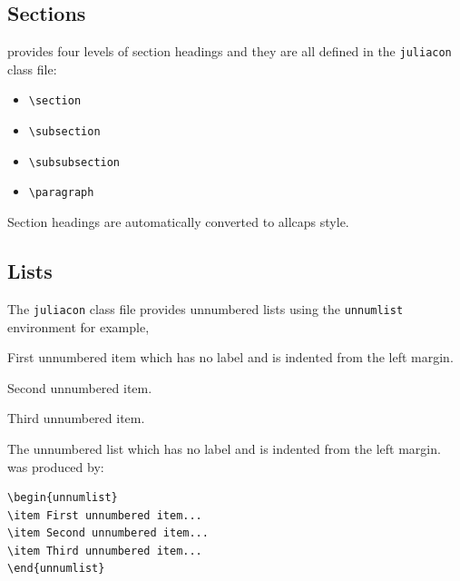 \documentclass{juliacon}
\begin{document}
\subsection{Sections}
\label{subsub:sections}
\LaTeXe{}  provides four levels of section headings and they are all
defined in the \verb|juliacon|  class file:
\begin{itemize}
\item \verb|\section|
\item \verb|\subsection|
\item \verb|\subsubsection|
\item \verb|\paragraph|
\end{itemize}
Section headings are automatically converted to allcaps style.
\subsection{Lists}
\label{sec:lists}
%
The \verb|juliacon|   class file provides unnumbered lists using the
\verb|unnumlist|  environment for example,

\begin{unnumlist}
\item First unnumbered item which has no label and is indented from the
left margin.
\item Second unnumbered item.
\item Third unnumbered item.
\end{unnumlist}
The unnumbered list which has no label and is indented from the
left margin. was produced by:
\begin{verbatim}
\begin{unnumlist}
\item First unnumbered item...
\item Second unnumbered item...
\item Third unnumbered item...
\end{unnumlist}
\end{verbatim}
\end{document}
